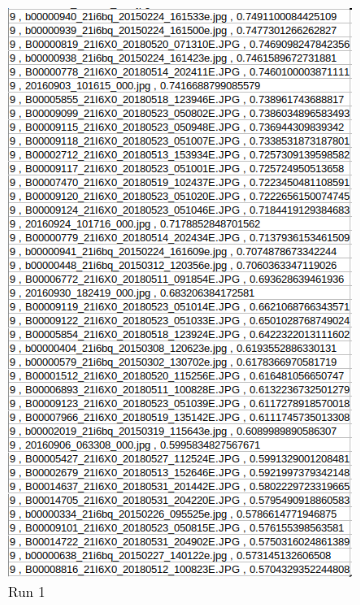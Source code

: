 \begin{figure}[H]
  \begin{subfigure}{0.4\textwidth}
  \includegraphics[width=\textwidth]{Sections/7Results/images/topic9_results.png} 
  \caption{Run 1}
  \end{subfigure}
  \hspace{+5mm}
  \begin{subfigure}{0.385\textwidth}

\end{subfigure}
\end{figure}
